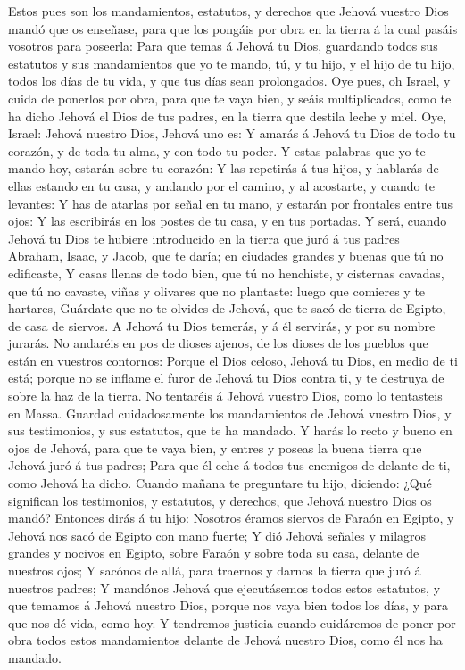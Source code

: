  Estos pues son los mandamientos, estatutos, y derechos que
Jehová vuestro Dios mandó que os enseñase, para que los pongáis por obra
en la tierra á la cual pasáis vosotros para poseerla:  Para
que temas á Jehová tu Dios, guardando todos sus estatutos y sus
mandamientos que yo te mando, tú, y tu hijo, y el hijo de tu hijo, todos
los días de tu vida, y que tus días sean prolongados.  Oye
pues, oh Israel, y cuida de ponerlos por obra, para que te vaya bien, y
seáis multiplicados, como te ha dicho Jehová el Dios de tus padres, en
la tierra que destila leche y miel.  Oye, Israel: Jehová
nuestro Dios, Jehová uno es:  Y amarás á Jehová tu Dios de
todo tu corazón, y de toda tu alma, y con todo tu poder.  Y
estas palabras que yo te mando hoy, estarán sobre tu corazón:
 Y las repetirás á tus hijos, y hablarás de ellas estando en
tu casa, y andando por el camino, y al acostarte, y cuando te levantes:
 Y has de atarlas por señal en tu mano, y estarán por
frontales entre tus ojos:  Y las escribirás en los postes de
tu casa, y en tus portadas.  Y será, cuando Jehová tu Dios
te hubiere introducido en la tierra que juró á tus padres Abraham,
Isaac, y Jacob, que te daría; en ciudades grandes y buenas que tú no
edificaste,  Y casas llenas de todo bien, que tú no
henchiste, y cisternas cavadas, que tú no cavaste, viñas y olivares que
no plantaste: luego que comieres y te hartares,  Guárdate
que no te olvides de Jehová, que te sacó de tierra de Egipto, de casa de
siervos.  A Jehová tu Dios temerás, y á él servirás, y por
su nombre jurarás.  No andaréis en pos de dioses ajenos, de
los dioses de los pueblos que están en vuestros contornos: 
Porque el Dios celoso, Jehová tu Dios, en medio de ti está; porque no se
inflame el furor de Jehová tu Dios contra ti, y te destruya de sobre la
haz de la tierra.  No tentaréis á Jehová vuestro Dios, como
lo tentasteis en Massa.  Guardad cuidadosamente los
mandamientos de Jehová vuestro Dios, y sus testimonios, y sus estatutos,
que te ha mandado.  Y harás lo recto y bueno en ojos de
Jehová, para que te vaya bien, y entres y poseas la buena tierra que
Jehová juró á tus padres;  Para que él eche á todos tus
enemigos de delante de ti, como Jehová ha dicho.  Cuando
mañana te preguntare tu hijo, diciendo: ¿Qué significan los testimonios,
y estatutos, y derechos, que Jehová nuestro Dios os mandó? 
Entonces dirás á tu hijo: Nosotros éramos siervos de Faraón en Egipto, y
Jehová nos sacó de Egipto con mano fuerte;  Y dió Jehová
señales y milagros grandes y nocivos en Egipto, sobre Faraón y sobre
toda su casa, delante de nuestros ojos;  Y sacónos de allá,
para traernos y darnos la tierra que juró á nuestros padres;
 Y mandónos Jehová que ejecutásemos todos estos estatutos,
y que temamos á Jehová nuestro Dios, porque nos vaya bien todos los
días, y para que nos dé vida, como hoy.  Y tendremos
justicia cuando cuidáremos de poner por obra todos estos mandamientos
delante de Jehová nuestro Dios, como él nos ha mandado.

